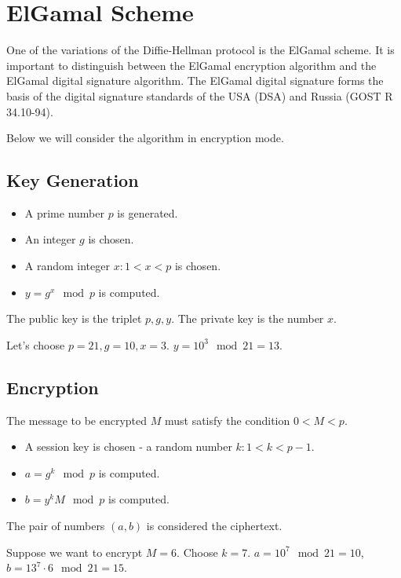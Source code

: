 \section{ElGamal Scheme}
\label{sec:add:dm:elgamal}
One of the variations of the Diffie-Hellman protocol is the ElGamal scheme. It is important to distinguish between the ElGamal encryption algorithm and the ElGamal digital signature algorithm. The ElGamal digital signature forms the basis of the digital signature standards of the USA (DSA) and Russia (GOST R 34.10-94).

Below we will consider the algorithm in encryption mode.

\subsection{Key Generation}

\begin{itemize}
\item A prime number $p$ is generated.
\item An integer $g$ is chosen.
\item A random integer $x: 1 < x < p$ is chosen.
\item $y = g^x \mod p$ is computed.
\end{itemize}

The public key is the triplet $p, g, y$. The private key is the number $x$.

\begin{example}
Let’s choose $p = 21, g = 10, x = 3$. $y = 10^3 \mod 21 = 13$.
\label{ex:add:dm:elgamal_gen}
\end{example}

\subsection{Encryption}
The message to be encrypted $M$ must satisfy the condition $0 < M < p$.
\begin{itemize}
\item A session key is chosen - a random number $k: 1 < k < p - 1$.
\item $a = g^k \mod p$ is computed.
\item $b = y^k M \mod p$ is computed.
\end{itemize}

The pair of numbers $(a, b)$ is considered the ciphertext.
\begin{example}
Suppose we want to encrypt $M=6$. Choose $k = 7$. $a = 10^7 \mod 21 = 10$, $b = 13^7 \cdot 6 \mod 21 = 15$.
\label{ex:add:dm:elgamal_crypt}
\end{example}

